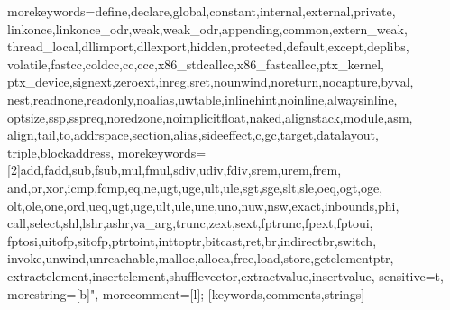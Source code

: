\usepackage[english]{babel}
\usepackage[utf8]{inputenc}
\usepackage[T1]{fontenc}
\usepackage{helvet}
\usepackage{nimbusmononarrow}
\usepackage{euler}
\usepackage{tikz}
\usepackage{listings}
\usepackage{relsize}
\usepackage{booktabs}
\usepackage{varwidth}

\usetikzlibrary{arrows}
\usetikzlibrary{backgrounds}
\usetikzlibrary{chains}
\usetikzlibrary{fit}
\usetikzlibrary{positioning}
\usetikzlibrary{scopes}
\usetikzlibrary{trees}
\usetikzlibrary{automata}
\usetikzlibrary{positioning}
\usetikzlibrary{shapes.multipart}

{
	\begin{centering}
		\vspace{1.5em}
		\LARGE
    \insertframetitle
    \par
    \vspace{0.5em}
  \end{centering}
}

\lstset{basicstyle=\ttfamily\scriptsize}
\newcommand{\cinput}[1]{}
\newcommand{\cinline}[1]{\lstinline[language=C,basicstyle=\ttfamily]!#1!}
\newcommand{\cppinput}[1]{}
\newcommand{\cppinline}[1]{\lstinline[language=C++,basicstyle=\ttfamily]!#1!}
\newcommand{\llvminput}[1]{}
\newcommand{\llvminline}[1]{\lstinline[language=LLVM,basicstyle=\ttfamily]!#1!}
%
  {morekeywords={define,declare,global,constant,internal,external,private,%
      linkonce,linkonce_odr,weak,weak_odr,appending,common,extern_weak,%
      thread_local,dllimport,dllexport,hidden,protected,default,except,deplibs,%
      volatile,fastcc,coldcc,cc,ccc,x86_stdcallcc,x86_fastcallcc,ptx_kernel,%
      ptx_device,signext,zeroext,inreg,sret,nounwind,noreturn,nocapture,byval,%
      nest,readnone,readonly,noalias,uwtable,inlinehint,noinline,alwaysinline,%
      optsize,ssp,sspreq,noredzone,noimplicitfloat,naked,alignstack,module,asm,%
      align,tail,to,addrspace,section,alias,sideeffect,c,gc,target,datalayout,%
      triple,blockaddress},%
  morekeywords=[2]{add,fadd,sub,fsub,mul,fmul,sdiv,udiv,fdiv,srem,urem,frem,%
     and,or,xor,icmp,fcmp,eq,ne,ugt,uge,ult,ule,sgt,sge,slt,sle,oeq,ogt,oge,%
     olt,ole,one,ord,ueq,ugt,uge,ult,ule,une,uno,nuw,nsw,exact,inbounds,phi,%
     call,select,shl,lshr,ashr,va_arg,trunc,zext,sext,fptrunc,fpext,fptoui,%
     fptosi,uitofp,sitofp,ptrtoint,inttoptr,bitcast,ret,br,indirectbr,switch,%
     invoke,unwind,unreachable,malloc,alloca,free,load,store,getelementptr,%
     extractelement,insertelement,shufflevector,extractvalue,insertvalue},%
  sensitive=t,%
  morestring=[b]",%
  morecomment=[l];%
  }[keywords,comments,strings]

